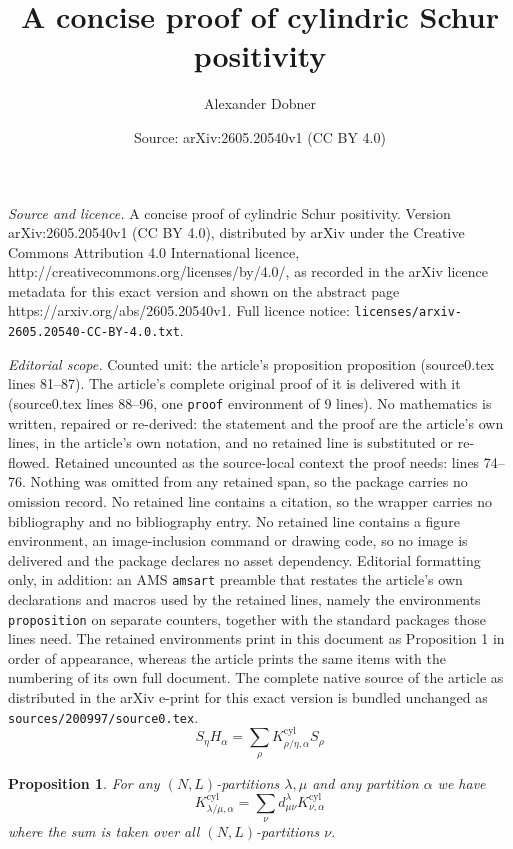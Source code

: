 \documentclass[10pt,a4paper]{amsart}
\title{A concise proof of cylindric Schur positivity}
\author{Alexander Dobner}
\date{Source: arXiv:2605.20540v1 (CC BY 4.0)}
\newtheorem{proposition}{Proposition}
\newcommand{\cyl}{\mathrm{cyl}}
\begin{document}
\maketitle

\noindent\emph{Source and licence.} A concise proof of cylindric Schur positivity. Version arXiv:2605.20540v1 (CC BY 4.0), distributed by arXiv under the Creative Commons Attribution 4.0 International licence, http://creativecommons.org/licenses/by/4.0/, as recorded in the arXiv licence metadata for this exact version and shown on the abstract page https://arxiv.org/abs/2605.20540v1. Full licence notice: \texttt{licenses/arxiv-2605.20540-CC-BY-4.0.txt}.\par\smallskip

\noindent\textit{Editorial scope.} Counted unit: the article's proposition proposition (source0.tex lines 81--87). The article's complete original proof of it is delivered with it (source0.tex lines 88--96, one \texttt{proof} environment of 9 lines). No mathematics is written, repaired or re-derived: the statement and the proof are the article's own lines, in the article's own notation, and no retained line is substituted or re-flowed.  Retained uncounted as the source-local context the proof needs: lines 74--76.  Nothing was omitted from any retained span, so the package carries no omission record.  No retained line contains a citation, so the wrapper carries no bibliography and no bibliography entry.  No retained line contains a figure environment, an image-inclusion command or drawing code, so no image is delivered and the package declares no asset dependency.  Editorial formatting only, in addition: an AMS \texttt{amsart} preamble that restates the article's own declarations and macros used by the retained lines, namely the environments \texttt{proposition} on separate counters, together with the standard packages those lines need.  The retained environments print in this document as Proposition 1 in order of appearance, whereas the article prints the same items with the numbering of its own full document.  The complete native source of the article as distributed in the arXiv e-print for this exact version is bundled unchanged as \texttt{sources/200997/source0.tex}.
\begin{equation} \label{eq:fusion-pieri}
    S_{\eta} H_{\alpha} = \sum_{\rho} K^{\cyl}_{\rho/\eta, \alpha} S_{\rho}
\end{equation}

\begin{proposition}
For any $(N,L)$-partitions $\lambda,\mu$ and any partition $\alpha$ we have
\[
K^\cyl_{\lambda/\mu,\alpha} = \sum_{\nu} d^\lambda_{\mu\nu} K^\cyl_{\nu,\alpha}
\]
where the sum is taken over all $(N,L)$-partitions $\nu$.
\end{proposition}
\end{document}
